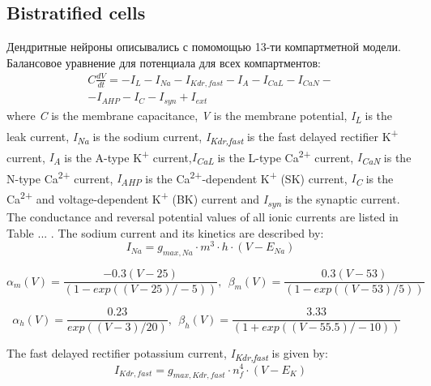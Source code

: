 \documentclass[12pt]{article}
\begin{document}
\bigskip

\subsection{Bistratified cells}
Дендритные нейроны описывались с помомощью 13-ти компартметной модели. Балансовое уравнение для потенциала для всех компартментов:
\begin{eqnarray}
C\frac{dV}{dt}=-I_L-I_{Na}-I_{Kdr,fast}-I_A-I_{CaL}-I_{CaN} - \nonumber \\ -I_{AHP}-I_C-I_{syn}+I_{ext}
\end{eqnarray}
where \textit{C} is the membrane capacitance, \textit{V} is the membrane potential, \textit{I\textsubscript{L}}
is the leak current, \textit{I\textsubscript{Na}} is the sodium current, \textit{I\textsubscript{Kdr,fast}} is the fast delayed rectifier K\textsuperscript{+} current, \textit{I}\textit{\textsubscript{A}} is the A-type K\textsuperscript{+} current,\textit{I\textsubscript{CaL}}
is the L-type Ca\textsuperscript{2+} current, \textit{I}\textit{\textsubscript{CaN}} is the N-type
Ca\textsuperscript{2+} current, \textit{I}\textit{\textsubscript{AHP}} is the Ca\textsuperscript{2+}-dependent
K\textsuperscript{+} (SK) current, \textit{I}\textit{\textsubscript{C}} is the Ca\textsuperscript{2+} and
voltage-dependent K\textsuperscript{+} (BK) current and \textit{I}\textit{\textsubscript{syn}} is the synaptic current.
The conductance and reversal potential values of all ionic currents are listed in Table ... .
The sodium current and its kinetics are described by:
\begin{equation}
I_{Na}=g_{max, Na} \cdot m^3 \cdot h \cdot (V-E_{Na})
\end{equation}

\begin{equation}
\alpha_m(V)=\frac{-0.3(V-25)}{(1-exp((V-25)/-5))}, \ \  \beta_m(V)=\frac{0.3(V-53)}{(1-exp((V-53)/5))} \ 
\end{equation}

\begin{equation}
\alpha_h(V)=\frac{0.23}{exp((V-3)/20)}, \ \  \beta_h(V)=\frac{3.33}{(1+exp((V-55.5)/-10))}\ \ \ 
\end{equation}

The fast delayed rectifier potassium current, \textit{I}\textit{\textsubscript{Kdr,fast}} is given by:
\begin{equation}
I_{Kdr, fast} = g_{max, Kdr, fast} \cdot n_f^4 \cdot (V-E_K)
\end{equation}
\end{document}
